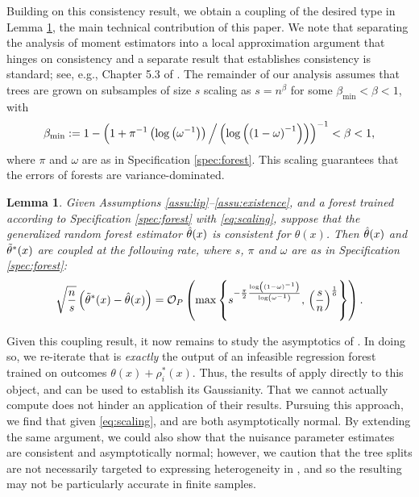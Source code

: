 \documentclass[aos]{imsart}
\theoremstyle{plain}
\newtheorem{lemm}[prop]{Lemma}
\theoremstyle{definition}
\theoremstyle{remark}
\begin{document}
\begin{CJK}{UTF8}{gbsn}
Building on this consistency result, we obtain a coupling of the desired type in Lemma \ref{lemm:coupling},
the main technical contribution of this paper.
We note that separating the analysis of moment estimators
into a local approximation argument that hinges on consistency and a separate result that establishes
consistency is standard; see, e.g., Chapter 5.3 of \citet{van2000asymptotic}.
The remainder of our analysis assumes that trees are grown on subsamples of size $s$
scaling as $s = n^\beta$ for some $\beta_{\min} < \beta < 1$, with
\begin{equation}
\label{eq:scaling}
\beta_{\min} := 1 - \p{1 + \pi^{-1} \p{\log\p{\omega^{-1}}} \Big/\p{\log\p{\p{1 - \omega}^{-1}}}}^{-1} < \beta < 1,
\end{equation}
where $\pi$ and $\omega$ are as in Specification \ref{spec:forest}.
This scaling guarantees that the errors of forests are variance-dominated.

\begin{lemm}
\label{lemm:coupling}
Given Assumptions \ref{assu:lip}--\ref{assu:existence},
and a forest trained according to Specification \ref{spec:forest} with \eqref{eq:scaling},
suppose that the generalized random forest estimator $\hat{\theta}(x)$ is
consistent for $\theta(x)$. Then $\hat{\theta}(x)$ and $\tilde{\theta}^*(x)$ are coupled
at the following rate, where $s$, $\pi$ and $\omega$ are as in Specification \ref{spec:forest}:
\begin{equation}
\label{eq:coupling}
\sqrt{\frac{n}{s}} \p{\ttheta^*(x) - \htheta(x)} = \oo_P\p{\max\cb{s^{-\frac{\pi}{2}\frac{\log\p{\p{1 - \omega}^{-1}}}{\log\p{\omega^{-1}}}}, \, \p{\frac{s}{n}}^{\frac{1}{6}}}}.
\end{equation}
\end{lemm}

Given this coupling result, it now remains to study the asymptotics of .
In doing so, we re-iterate that  is \emph{exactly} the output of an infeasible
regression forest trained on outcomes $\theta(x) + \rho_i^*(x)$. Thus, the results of
\citet{wager2015estimation} apply directly to this object, and can be used to establish
its Gaussianity. That we cannot actually compute 
does not hinder an application of their results.
Pursuing this approach, we find that given \eqref{eq:scaling},  and
 are both asymptotically normal. By extending the same
argument, we could also show that the nuisance parameter estimates  are
consistent and asymptotically normal; however, we caution that the tree splits are not necessarily
targeted to expressing heterogeneity in , and so the resulting 
may not be particularly accurate in finite samples.


\end{CJK}
\end{document}
